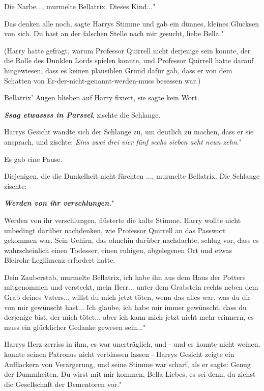 \glqq Die Narbe...\grqq{}, murmelte Bellatrix. \glqq Dieses Kind..."

\glqq Das denken alle noch\grqq{}, sagte Harrys Stimme und gab ein dünnes,
kleines Glucksen von sich. \glqq Du hast an der falschen Stelle nach mir
gesucht, liebe Bella."

(Harry hatte gefragt, warum Professor Quirrell nicht derjenige sein konnte, der
die Rolle des Dunklen Lords spielen konnte, und Professor Quirrell hatte darauf
hingewiesen, dass es keinen plausiblen Grund dafür gab, dass er von dem Schatten
von Er-der-nicht-genannt-werden-muss besessen war.)

Bellatrix' Augen blieben auf Harry fixiert, sie sagte kein Wort.

\glqq \textbf{\emph{Ssag etwassss in Parssel}}\grqq{}, zischte die Schlange.

Harrys Gesicht wandte sich der Schlange zu, um deutlich zu machen, dass er sie
ansprach, und zischte: \glqq \emph{Eins zwei drei vier fünf sechs sieben acht
neun zehn}."

Es gab eine Pause.

\glqq Diejenigen, die die Dunkelheit nicht fürchten ...\grqq{}, murmelte
Bellatrix. Die Schlange zischte:

\glqq \textbf{\emph{Werden von ihr verschlungen.}}"

\glqq Werden von ihr verschlungen\grqq{}, flüsterte die kalte Stimme. Harry
wollte nicht unbedingt darüber nachdenken, wie Professor Quirrell an das
Passwort gekommen war. Sein Gehirn, das ohnehin darüber nachdachte, schlug vor,
dass es wahrscheinlich einen Todesser, einen ruhigen, abgelegenen Ort und etwas
Bleirohr-Legilimenz erfordert hatte.

\glqq Dein Zauberstab\grqq{}, murmelte Bellatrix, \glqq ich habe ihn aus dem
Haus der Potters mitgenommen und versteckt, mein Herr... unter dem Grabstein
rechts neben dem Grab deines Vaters... willst du mich jetzt töten, wenn das
alles war, was du dir von mir gewünscht hast... Ich glaube, ich habe mir immer
gewünscht, dass du derjenige bist, der mich tötet... aber ich kann mich jetzt
nicht mehr erinnern, es muss ein glücklicher Gedanke gewesen sein..."

Harrys Herz zerriss in ihm, es war unerträglich, und - und er konnte nicht
weinen, konnte seinen Patronus nicht verblassen lassen - Harrys Gesicht zeigte
ein Aufflackern von Verärgerung, und seine Stimme war scharf, als er sagte:
\glqq Genug der Dummheiten. Du wirst mit mir kommen, Bella Liebes, es sei denn,
du ziehst die Gesellschaft der Dementoren vor."

